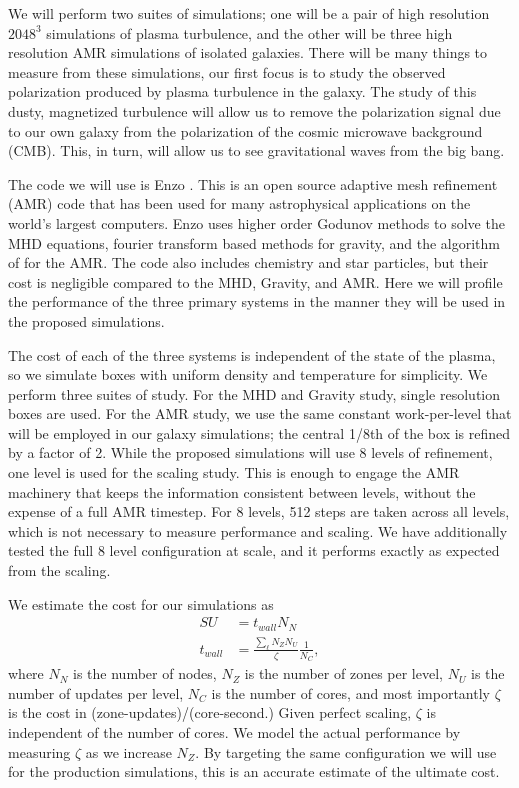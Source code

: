 
We will perform two suites of simulations; one will be a pair of high resolution $2048^3$
simulations of plasma turbulence, and the other will be three high resolution
AMR simulations of isolated galaxies.  There will be many things to measure from
these simulations, our first focus is to study the observed polarization produced by
plasma turbulence in the galaxy.  The study of this dusty, magnetized turbulence
will allow us to remove the polarization signal due to our own galaxy from the
polarization of the cosmic microwave background (CMB).  This, in turn, will
allow us to see gravitational waves from the big bang.

The code we will use is Enzo \citep{Collins10, Bryan14}.  This is an open source
adaptive mesh refinement (AMR) code that has been used for many astrophysical
applications on the world's largest computers.  Enzo uses higher order Godunov
methods to solve the MHD equations, fourier transform based methods for gravity,
and the algorithm of \citet{Berger89} for the AMR.  The code also includes
chemistry and star particles, but their cost is negligible compared to the MHD,
Gravity, and AMR.  Here we will profile the performance of the three primary
systems in the manner they will be used in the proposed simulations.

The cost of each of the three systems is independent of the state of the plasma,
so we simulate boxes with uniform density and temperature for simplicity.  We
perform three suites of study.  For the MHD and Gravity study, single resolution
boxes are used.  For the AMR study, we use the same constant work-per-level
that will be employed in our galaxy simulations; the central 1/8th of the box is
refined by a factor of 2.  
While the proposed simulations will use 8 levels of
refinement, one level is used for the scaling study.  This is enough to engage the AMR machinery that keeps the
information consistent between levels, without the expense of a full AMR
timestep.  For 8 levels, 512 steps are taken across all levels, which is not
necessary to measure performance and scaling.
We have additionally tested the full 8 level configuration at scale, and it
performs exactly as expected from the scaling.

We estimate the cost for our simulations as 
\begin{align}
SU &= t_{wall} N_N\\
t_{wall} &= \frac{\sum_\ell N_Z N_U}{\zeta}\frac{1}{N_C},
\end{align}
where $N_N$ is the number of nodes, $N_Z$ is the number of zones per level,
$N_U$ is the number of updates per level, $N_C$ is the number of cores, and most
importantly $\zeta$ is the cost in (zone-updates)/(core-second.)  Given perfect
scaling, $\zeta$ is independent of the number of cores.  We model the actual
performance by measuring $\zeta$ as we increase $N_Z$.  By targeting the same
configuration we will use for the production simulations, this is an accurate
estimate of the ultimate cost.

